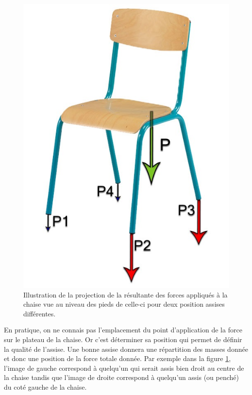\documentclass{polytech/polytech}
\begin{document}
\begin{figure}[htbp]
\begin{center}
\includegraphics[scale=1]{image/Chaise_forces_hetero.jpg}
\end{center}
\caption{Illustration de la projection de la résultante des forces appliqués à la chaise vue au niveau des pieds de celle-ci pour deux position assises différentes.}
\label{fig:illustr_chaise_forces}
\end{figure}

En pratique, on ne connais pas l'emplacement du point d'application de la force sur le plateau de la chaise. Or c'est déterminer sa position qui permet de définir la qualité de l'assise. Une bonne assise donnera une répartition des masses donnée et donc une position de la force totale donnée. Par exemple dans la figure \ref{fig:illustr_chaise_forces}, l'image de gauche correspond à quelqu'un qui serait assis bien droit au centre de la chaise tandis que l'image de droite correspond à quelqu'un assis (ou penché) du coté gauche de la chaise.
\end{document}
